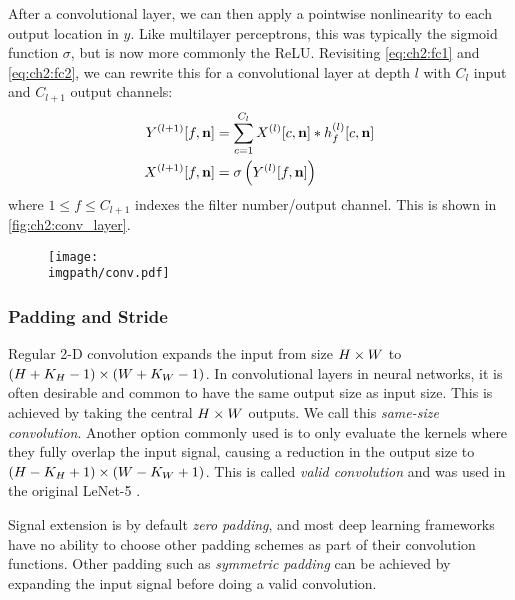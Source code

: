 After a convolutional layer, we can then apply a pointwise nonlinearity to
each output location in $y$. Like multilayer perceptrons, this was typically the
sigmoid function $\sigma$, but is now more commonly the ReLU. Revisiting
\eqref{eq:ch2:fc1} and
\eqref{eq:ch2:fc2}, we can rewrite this for a convolutional layer at depth $l$
with $C_l$ input and $C_{l+1}$ output channels:
\begin{align}
  Y^{(l+1)}[f, \mathbf{n}] &= \sum_{c=1}^{C_l} X^{(l)}[c, \mathbf{n}] \ast h^{(l)}_f[c, \mathbf{n}] 
    \label{eq:ch2:conv4}\\
    X^{(l+1)}[f, \mathbf{n}] &= \sigma\left(Y^{(l)}[f, \mathbf{n}]\right) \label{eq:ch2:conv4a}
\end{align}
where $ 1 \leq f \leq C_{l+1}$ indexes the filter number/output channel. This is shown in \autoref{fig:ch2:conv_layer}.

\begin{figure}
  \centering
  \texttt{[image: \\imgpath/conv.pdf]}
  \label{fig:ch2:conv_layer}
\end{figure}

\subsubsection{Padding and Stride}
Regular 2-D convolution expands the input from size $H\times W$ to $(H+K_H-1)\times
(W+K_W-1)$. In convolutional layers in neural networks, it is often desirable
and common to have the same output size as input size. This is achieved by
taking the central $H\times W$ outputs. We call this \emph{same-size convolution}.
Another option commonly used is to only evaluate the kernels where they fully
overlap the input signal, causing a reduction in the output size to $(H-K_H+1)
\times (W-K_W+1)$. This is called \emph{valid convolution} and was used in the
original LeNet-5 \cite{lecun_gradient-based_1998}.

Signal extension is by default \emph{zero padding}, and most deep learning
frameworks have no ability to choose other padding schemes as part of their
convolution functions. Other padding such as \emph{symmetric padding} can be
achieved by expanding the input signal before doing a valid convolution.

